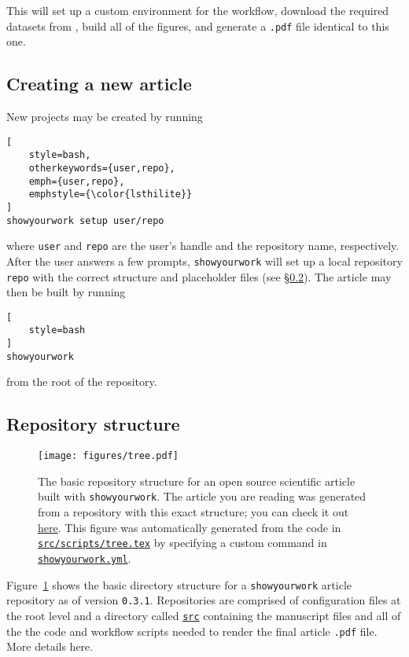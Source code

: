 \documentclass{aastex631}
\newcommand\VERSION{\texttt{0.3.1}\xspace}
\newcommand\xxx[1]{{\color{red}#1}}
\newcommand\syw{\texttt{showyourwork}\xspace}
\newcommand\pdf{\texttt{.pdf}\xspace}
\newcommand\repoargurl{https://github.com/showyourwork/showyourwork-paper}
\newcommand\commiturl{\repoargurl/tree/\GitHubSHA}
\newcommand\fileurl[1]{\repoargurl/blob/\GitHubSHA/#1}
\newcommand\repoargfile[1]{\href{\fileurl{#1}}{\texttt{#1}\xspace}}
\newcommand\userarg{\texttt{\color{lsthilite}user}\xspace}
\newcommand\repoarg{\texttt{\color{lsthilite}repo}\xspace}
\begin{document}
\noindent This will set up a custom \conda environment for the workflow, download the required datasets from \Zenodo, build all of the figures, and generate a \pdf file identical to this one.

\subsection{Creating a new article}
\label{sec:usage:new}
New projects may be created by running\\

\noindent\begin{minipage}{\linewidth}
\begin{lstlisting}[
    style=bash,
    otherkeywords={user,repo},
    emph={user,repo},
    emphstyle={\color{lsthilite}}
]
showyourwork setup user/repo
\end{lstlisting}
\end{minipage}



\noindent where \userarg and \repoarg are the user's \GitHub handle and the repository name, respectively. 
After the user answers a few prompts, \syw will set up a local \git repository \repoarg with the correct structure and placeholder files (see \S\ref{sec:usage:struct}).
The article may then be built by running\\

\noindent\begin{minipage}{\linewidth}
\begin{lstlisting}[
    style=bash
]
showyourwork
\end{lstlisting}
\end{minipage}

\noindent from the root of the repository.

\subsection{Repository structure}
\label{sec:usage:struct}
%
\begin{figure}[p!]
    \begin{centering}
        \texttt{[image: figures/tree.pdf]}
        \caption{
            The basic repository structure for an open source scientific article built with \syw.
            The article you are reading was generated from a repository with this exact structure; you can check it out \href{\commiturl}{here}.
            This figure was automatically generated from the \TikZ code in \repoargfile{src/scripts/tree.tex} by specifying a custom command in \repoargfile{showyourwork.yml}.
        }
        \label{fig:tree}
    \end{centering}
\end{figure}
%
Figure~\ref{fig:tree} shows the basic directory structure for a \syw article repository as of version \VERSION{}.
Repositories are comprised of configuration files at the root level and a directory called \repoargfile{src} containing the manuscript files and all of the the code and workflow scripts needed to render the final article \pdf file.
%
\xxx{More details here.}
\end{document}
